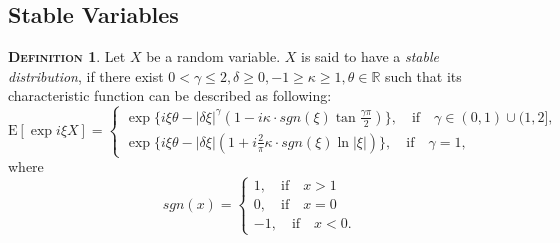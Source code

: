 \documentclass[a4paper, twoside, 11pt]{article}
\theoremstyle{definition}
\newtheorem{definition}{\scshape Definition}[section]
\newtheorem{lemma}[definition]{\scshape Lemma}
\begin{document}
  \subsection{Stable Variables}


  \begin{definition}
	Let $X$ be a random variable. $X$ is said to have a \emph{stable distribution}, if there exist $0 < \gamma \le 2, \delta \ge 0, -1 \ge \kappa \ge 1, \theta \in \mathbb{R}$ such that its characteristic function can be described as following:
	\begin{equation}
	  \mathrm{E} [\exp i\xi X] =  \begin{cases} \exp\{i \xi \theta - |\delta\xi|^\gamma(1-i\kappa\cdot sgn(\xi)\tan \frac{\gamma\pi}{2})\},\hspace{1em}  \text{if}\hspace{1em} \gamma \in (0, 1) \cup (1, 2], \\
		  \exp\{i \xi \theta - |\delta\xi|(1+i\frac{2}{\pi}\kappa\cdot sgn(\xi)\ln |\xi|)\},\hspace{1em} \text{if}\hspace{1em} \gamma = 1,
		\end{cases}
	  \label{sec:stbl}
	\end{equation}
   where
  $$
   sgn(x) = \begin{cases} 1,\hspace{1em} \text{if}\hspace{1em} x > 1\\
	 0,\hspace{1em} \text{if}\hspace{1em} x = 0 \\
	 -1,\hspace{1em}\text{if}\hspace{1em} x < 0.
   \end{cases}
	$$
  \end{definition}
\end{document}
